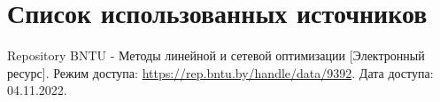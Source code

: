 \newpage

\begingroup
  \section*{Список использованных источников}

  \renewcommand{\addcontentsline}[3]{}%
  \renewcommand{\section}[2]{}%

  \begin{thebibliography}{}
    Repository BNTU - Методы линейной и сетевой оптимизации
    [Электронный ресурс].
    Режим доступа: \url{https://rep.bntu.by/handle/data/9392}.
    Дата доступа: 04.11.2022.
  \end{thebibliography}
\endgroup


\begingroup
  \section*{Литература, чтобы писать в \TeX~(\LaTeX)}
  \addcontentsline{toc}{section}{Литература, чтобы писать в LaTeX}

  \renewcommand{\addcontentsline}[3]{}%
  \renewcommand{\section}[2]{}%

